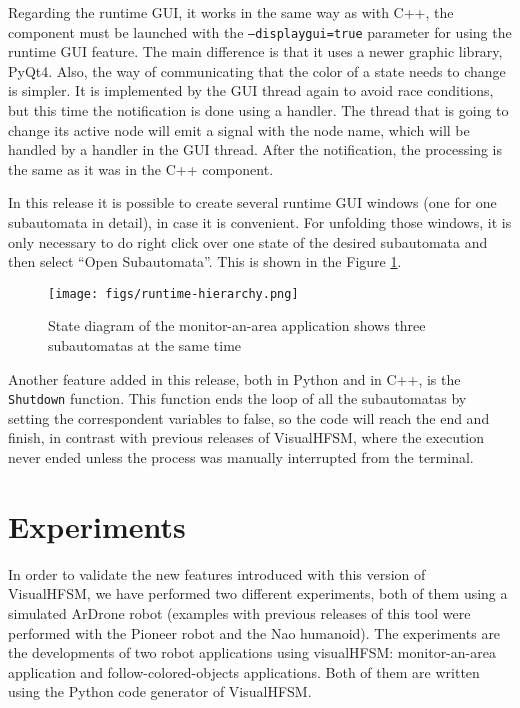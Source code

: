 \documentclass[journal,twoside]{JoPhA}
\begin{document}
Regarding the runtime GUI, it works in the same way as with C++, the component must be launched with the \texttt{--displaygui=true} parameter for using the runtime GUI feature. The main difference is that it uses a newer graphic library, PyQt4. Also, the way of communicating that the color of a state needs to change is simpler. It is implemented by the GUI thread again to avoid race conditions, but this time the notification is done using a handler. The thread that is going to change its active node will emit a signal with the node name, which will be handled by a handler in the GUI thread. After the notification, the processing is the same as it was in the C++ component. 

In this release it is possible to create several runtime GUI windows (one for one subautomata in detail), in case it is convenient. For unfolding those windows, it is only necessary to do right click over one state of the desired subautomata and then select “Open Subautomata”. This is shown in the Figure \ref{fig:runtime-hierarchy}.

\begin{figure}[ht!]
\begin{center}
        \texttt{[image: figs/runtime-hierarchy.png]}
\end{center}
\caption{State diagram of the monitor-an-area application shows three subautomatas at the same time}
\label{fig:runtime-hierarchy}
\end{figure}

Another feature added in this release, both in Python and in C++, is the \texttt{Shutdown} function. This function ends the loop of all the subautomatas by setting the correspondent variables to false, so the code will reach the end and finish, in contrast with previous releases of VisualHFSM, where the execution never ended unless the process was manually interrupted from the terminal.

\section{Experiments}

In order to validate the new features introduced with this version of VisualHFSM, we have performed two different experiments, both of them using a simulated ArDrone robot (examples with previous releases of this tool were performed with the Pioneer robot and the Nao humanoid). The experiments are the developments of two robot applications using visualHFSM: monitor-an-area application and follow-colored-objects applications. Both of them are written using the Python code generator of VisualHFSM.
\end{document}
